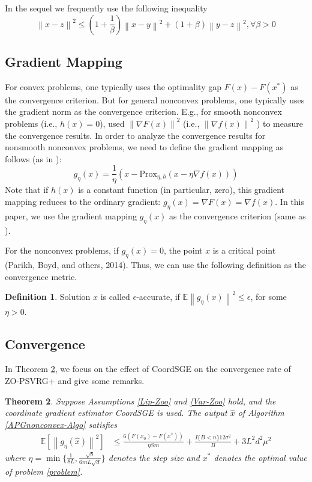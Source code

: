 \documentclass{article}
\newcommand*{\Po}{\text{Prox}}
\newcommand*{\E}{\mathbb{E}}
\newcommand{\norm}[1]{\left\lVert#1\right\rVert}
\newtheorem{theorem}{Theorem}[section]
\theoremstyle{definition}
\newtheorem{definition}[theorem]{Definition}
\theoremstyle{remark}
\begin{document}
In the sequel we frequently use the following inequality
\begin{equation}\label{young}
\norm{x-z}^2 \leq (1+\frac{1}{\beta})\norm{x-y}^2 + (1+\beta) \norm{{y-z}}^2, \forall \beta> 0
\end{equation}
\subsection{Gradient Mapping}
{\color{Violet}
For convex problems, one typically uses the optimality gap $F(x) - F(x^*)$ as the convergence criterion. But for general nonconvex problems, one typically uses the gradient norm as the convergence
criterion. E.g., for smooth nonconvex problems (i.e., $h(x) = 0$), \cite{ghadimi2013stochastic,reddi2016stochastic,
lei2017non,liu2018zeroth}  used $\norm{\nabla F(x)}^2$ (i.e., $\norm{\nabla f(x)}^2$ ) to measure the convergence results. In order to analyze the
convergence results for nonsmooth nonconvex problems, we need to define the gradient mapping as follows (as in \cite{ghadimi2016accelerated,reddi2016proximal,huang2019faster}):
\begin{equation}
g_{\eta}(x) = \frac{1}{\eta}(x-\Po_{\eta,h}(x-\eta \nabla f(x)))
\end{equation}
Note that if $h(x)$ is a constant function (in particular, zero), this gradient mapping reduces to the ordinary gradient:
$g_{\eta}(x) = \nabla F(x) = \nabla f(x)$. In this paper, we use the gradient mapping $g_{\eta}(x)$ as the convergence criterion (same as
\cite{ghadimi2016accelerated,reddi2016proximal,parikh2014proximal}).}
{\color{Green}
For the nonconvex problems, if $g_{\eta}(x) = 0$, the point $x$ is a critical point (Parikh, Boyd, and others, 2014). Thus, we can
use the following definition as the convergence metric.
\begin{definition}
Solution $x$ is called $\epsilon$-accurate, if $\E\norm{g_{\eta}(x)}^2 \leq \epsilon$, for some $\eta > 0$.
\end{definition}
}
\subsection{Convergence}
In Theorem \ref{noncon-zoo}, we focus on the effect of CoordSGE on the convergence rate of ZO-PSVRG+ and give some remarks.

\begin{theorem}\label{noncon-zoo}
Suppose Assumptions \ref{Lip-Zoo} and \ref{Var-Zoo} hold, and the coordinate gradient estimator CoordSGE is used. The output $\hat{x}$ of Algorithm \ref{APGnonconvex-Algo} satisfies
  \begin{equation}\label{noncon-zoo-main}
  \begin{split}
\E[\norm{g_{\eta}(\hat{x})}^2] & \leq \frac{6\left(F(x_0) - F({x}^*)\right)}{\eta Sm} + \frac{I\{B < n\}12\sigma ^2}{B}+3{L^2 d^2 \mu^2}
\end{split}
 \end{equation}
where $\eta = \min\{\frac{1}{8L}, \frac{\sqrt{b}}{6mL\sqrt{d}}\}$ denotes the step size and $x^*$ denotes the optimal value of problem \ref{problem}.
\end{theorem}
\end{document}
